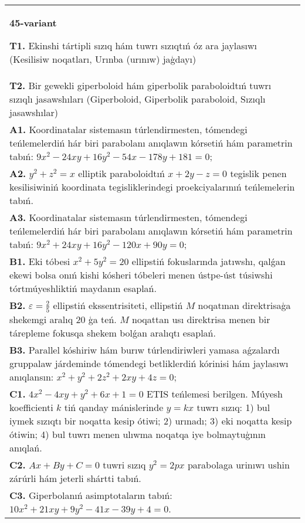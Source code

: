 \documentclass{article}
\begin{document}
\begin{tabular}{m{17cm}}
\textbf{45-variant}
\newline

\textbf{T1.} Ekinshi tártipli sızıq hám tuwrı sızıqtıń óz ara jaylasıwı (Kesilisiw noqatları, Urınba (urınıw) jaģdayı) \\
\textbf{T2.} Bir gewekli giperboloid hám giperbolik paraboloidtıń tuwrı sızıqlı jasawshıları (Giperboloid, Giperbolik paraboloid, Sızıqlı jasawshılar) \\
\textbf{A1.} Koordinatalar sistemasın túrlendirmesten, tómendegi teńlemelerdiń hár biri parabolanı anıqlawın kórsetiń hám parametrin tabıń: $9 x^2-24 x y+16 y^2-54 x-178 y+181=0$; \\
\textbf{A2.} $y^2+z^2=x$ elliptik paraboloidtıń $x+2 y-z=0$ tegislik penen kesilisiwiniń koordinata tegisliklerindegi proekciyalarınıń teńlemelerin tabıń. \\
\textbf{A3.} Koordinatalar sistemasın túrlendirmesten, tómendegi teńlemelerdiń hár biri parabolanı anıqlawın kórsetiń hám parametrin tabıń: $9 x^2+24 x y+16 y^2-120 x+90 y=0$; \\
\textbf{B1.} Eki tóbesi $x^2+5 y^2=20$ ellipstiń fokuslarında jatıwshı, qalǵan ekewi bolsa onıń kishi kósheri tóbeleri menen ústpe-úst túsiwshi tórtmúyeshliktiń maydanın esaplań. \\
\textbf{B2.} $\varepsilon=\frac{2}{5}$ ellipstiń ekssentrisiteti, ellipstiń $M$ noqatınan direktrisaģa shekemgi aralıq 20 ģa teń. $M$ noqattan usı direktrisa menen bir tárepleme fokusqa shekem bolǵan aralıqtı esaplań. \\
\textbf{B3.} Parallel kóshiriw hám burıw túrlendiriwleri yamasa aǵzalardı gruppalaw járdeminde tómendegi betliklerdiń kórinisi hám jaylasıwı anıqlansın: $x^2+y^2+2 z^2+2 x y+4 z=0$; \\
\textbf{C1.} $4 x^2-4 x y+y^2+6 x+1=0$ ETIS teńlemesi berilgen. Múyesh koefficienti $k$ tiń qanday mánislerinde $y=kx$ tuwrı sızıq: 1) bul iymek sızıqtı bir noqatta kesip ótiwi; 2) urınadı; 3) eki noqatta kesip ótiwin; 4) bul tuwrı menen ulıwma noqatqa iye bolmaytuģının anıqlań. \\
\textbf{C2.} $A x+B y+C=0$ tuwri sızıq $y^2=2 p x$ parabolaga urinıwı ushin zárúrli hám jeterli shártti tabıń. \\
\textbf{C3.} Giperbolanıń asimptotaların tabıń: $10 x^2+21 x y+9 y^2-41 x-39 y+4=0$. \\

\end{tabular}
\vspace{1cm}
\end{document}
